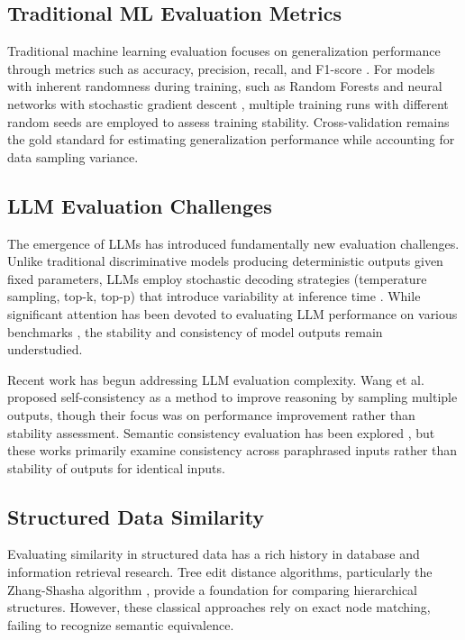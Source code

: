 \documentclass[letterpaper]{article} %
\begin{document}
\subsection{Traditional ML Evaluation Metrics}

Traditional machine learning evaluation focuses on generalization performance through metrics such as accuracy, precision, recall, and F1-score \cite{Sokolova2009}. For models with inherent randomness during training, such as Random Forests \cite{Breiman2001} and neural networks with stochastic gradient descent \cite{Bottou2010}, multiple training runs with different random seeds are employed to assess training stability. Cross-validation \cite{Kohavi1995} remains the gold standard for estimating generalization performance while accounting for data sampling variance.

\subsection{LLM Evaluation Challenges}

The emergence of LLMs has introduced fundamentally new evaluation challenges. Unlike traditional discriminative models producing deterministic outputs given fixed parameters, LLMs employ stochastic decoding strategies (temperature sampling, top-k, top-p) that introduce variability at inference time \cite{Holtzman2020}. While significant attention has been devoted to evaluating LLM performance on various benchmarks \cite{Liang2022, Srivastava2023}, the stability and consistency of model outputs remain understudied.

Recent work has begun addressing LLM evaluation complexity. Wang et al. \cite{Wang2023} proposed self-consistency as a method to improve reasoning by sampling multiple outputs, though their focus was on performance improvement rather than stability assessment. Semantic consistency evaluation has been explored \cite{Elazar2021, Raj2022}, but these works primarily examine consistency across paraphrased inputs rather than stability of outputs for identical inputs.

\subsection{Structured Data Similarity}

Evaluating similarity in structured data has a rich history in database and information retrieval research. Tree edit distance algorithms, particularly the Zhang-Shasha algorithm \cite{Zhang1989}, provide a foundation for comparing hierarchical structures. However, these classical approaches rely on exact node matching, failing to recognize semantic equivalence.
\end{document}
